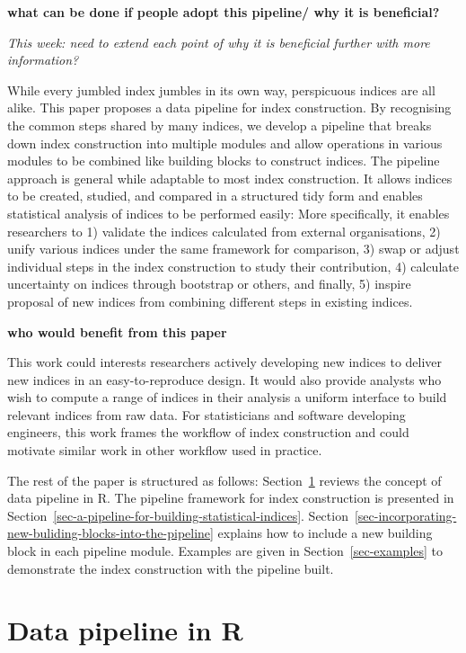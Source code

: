 \documentclass[
]{article}
\begin{document}
\textbf{what can be done if people adopt this pipeline/ why it is
beneficial?}

\emph{This week: need to extend each point of why it is beneficial
further with more information?}

While every jumbled index jumbles in its own way, perspicuous indices
are all alike. This paper proposes a data pipeline for index
construction. By recognising the common steps shared by many indices, we
develop a pipeline that breaks down index construction into multiple
modules and allow operations in various modules to be combined like
building blocks to construct indices. The pipeline approach is general
while adaptable to most index construction. It allows indices to be
created, studied, and compared in a structured tidy form and enables
statistical analysis of indices to be performed easily: More
specifically, it enables researchers to 1) validate the indices
calculated from external organisations, 2) unify various indices under
the same framework for comparison, 3) swap or adjust individual steps in
the index construction to study their contribution, 4) calculate
uncertainty on indices through bootstrap or others, and finally, 5)
inspire proposal of new indices from combining different steps in
existing indices.

\textbf{who would benefit from this paper}

This work could interests researchers actively developing new indices to
deliver new indices in an easy-to-reproduce design. It would also
provide analysts who wish to compute a range of indices in their
analysis a uniform interface to build relevant indices from raw data.
For statisticians and software developing engineers, this work frames
the workflow of index construction and could motivate similar work in
other workflow used in practice.

The rest of the paper is structured as follows:
Section~\ref{sec-data-pipeline-in-r} reviews the concept of data
pipeline in R. The pipeline framework for index construction is
presented in
Section~\ref{sec-a-pipeline-for-building-statistical-indices}.
Section~\ref{sec-incorporating-new-buliding-blocks-into-the-pipeline}
explains how to include a new building block in each pipeline module.
Examples are given in Section~\ref{sec-examples} to demonstrate the
index construction with the pipeline built.

\hypertarget{sec-data-pipeline-in-r}{%
\section{Data pipeline in R}\label{sec-data-pipeline-in-r}}
\end{document}
